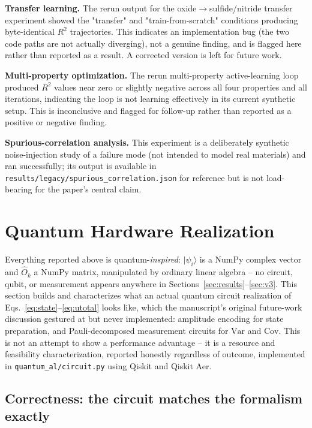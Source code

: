 \documentclass[conference]{IEEEtran}
\begin{document}
\textbf{Transfer learning.} The rerun output for the oxide$\to$sulfide/nitride transfer experiment showed the "transfer" and "train-from-scratch" conditions producing byte-identical $R^2$ trajectories. This indicates an implementation bug (the two code paths are not actually diverging), not a genuine finding, and is flagged here rather than reported as a result. A corrected version is left for future work.

\textbf{Multi-property optimization.} The rerun multi-property active-learning loop produced $R^2$ values near zero or slightly negative across all four properties and all iterations, indicating the loop is not learning effectively in its current synthetic setup. This is inconclusive and flagged for follow-up rather than reported as a positive or negative finding.

\textbf{Spurious-correlation analysis.} This experiment is a deliberately synthetic noise-injection study of a failure mode (not intended to model real materials) and ran successfully; its output is available in \texttt{results/legacy/spurious\_correlation.json} for reference but is not load-bearing for the paper's central claim.

\section{Quantum Hardware Realization}\label{sec:hardware}

Everything reported above is quantum-\emph{inspired}: $|\psi_i\rangle$ is a NumPy complex vector and $\hat{O}_k$ a NumPy matrix, manipulated by ordinary linear algebra -- no circuit, qubit, or measurement appears anywhere in Sections~\ref{sec:results}--\ref{sec:v3}. This section builds and characterizes what an actual quantum circuit realization of Eqs.~\eqref{eq:state}--\eqref{eq:utotal} looks like, which the manuscript's original future-work discussion gestured at but never implemented: amplitude encoding for state preparation, and Pauli-decomposed measurement circuits for $\mathrm{Var}$ and $\mathrm{Cov}$. This is not an attempt to show a performance advantage -- it is a resource and feasibility characterization, reported honestly regardless of outcome, implemented in \texttt{quantum\_al/circuit.py} using Qiskit and Qiskit Aer.

\subsection{Correctness: the circuit matches the formalism exactly}
\end{document}
